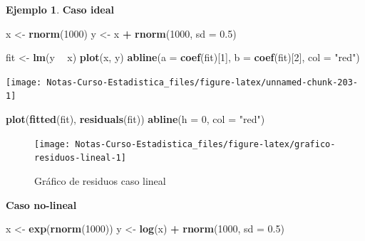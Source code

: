 \documentclass[
  12pt,
]{book}
\newenvironment{Shaded}{\begin{snugshade}}{\end{snugshade}}
\newcommand{\DataTypeTok}[1]{\textcolor[rgb]{0.13,0.29,0.53}{#1}}
\newcommand{\DecValTok}[1]{\textcolor[rgb]{0.00,0.00,0.81}{#1}}
\newcommand{\FloatTok}[1]{\textcolor[rgb]{0.00,0.00,0.81}{#1}}
\newcommand{\KeywordTok}[1]{\textcolor[rgb]{0.13,0.29,0.53}{\textbf{#1}}}
\newcommand{\NormalTok}[1]{#1}
\newcommand{\OperatorTok}[1]{\textcolor[rgb]{0.81,0.36,0.00}{\textbf{#1}}}
\newcommand{\StringTok}[1]{\textcolor[rgb]{0.31,0.60,0.02}{#1}}
\theoremstyle{definition}
\theoremstyle{definition}
\newtheorem{example}{Ejemplo}[chapter]
\theoremstyle{definition}
\theoremstyle{remark}
\begin{document}
\begin{example}

\textbf{Caso ideal}

\begin{Shaded}
\begin{Highlighting}[]
\NormalTok{x <-}\StringTok{ }\KeywordTok{rnorm}\NormalTok{(}\DecValTok{1000}\NormalTok{)}
\NormalTok{y <-}\StringTok{ }\NormalTok{x }\OperatorTok{+}\StringTok{ }\KeywordTok{rnorm}\NormalTok{(}\DecValTok{1000}\NormalTok{, }\DataTypeTok{sd =} \FloatTok{0.5}\NormalTok{)}

\NormalTok{fit <-}\StringTok{ }\KeywordTok{lm}\NormalTok{(y }\OperatorTok{~}\StringTok{ }\NormalTok{x)}
\KeywordTok{plot}\NormalTok{(x, y)}
\KeywordTok{abline}\NormalTok{(}\DataTypeTok{a =} \KeywordTok{coef}\NormalTok{(fit)[}\DecValTok{1}\NormalTok{], }\DataTypeTok{b =} \KeywordTok{coef}\NormalTok{(fit)[}\DecValTok{2}\NormalTok{], }\DataTypeTok{col =} \StringTok{"red"}\NormalTok{)}
\end{Highlighting}
\end{Shaded}

\begin{center}\texttt{[image: Notas-Curso-Estadistica\_files/figure-latex/unnamed-chunk-203-1]} \end{center}

\begin{Shaded}
\begin{Highlighting}[]
\KeywordTok{plot}\NormalTok{(}\KeywordTok{fitted}\NormalTok{(fit), }\KeywordTok{residuals}\NormalTok{(fit))}
\KeywordTok{abline}\NormalTok{(}\DataTypeTok{h =} \DecValTok{0}\NormalTok{, }\DataTypeTok{col =} \StringTok{"red"}\NormalTok{)}
\end{Highlighting}
\end{Shaded}

\begin{figure}

{\centering \texttt{[image: Notas-Curso-Estadistica\_files/figure-latex/grafico-residuos-lineal-1]} 

}

\caption{Gráfico de residuos caso lineal}\label{fig:grafico-residuos-lineal}
\end{figure}

\textbf{Caso no-lineal}

\begin{Shaded}
\begin{Highlighting}[]
\NormalTok{x <-}\StringTok{ }\KeywordTok{exp}\NormalTok{(}\KeywordTok{rnorm}\NormalTok{(}\DecValTok{1000}\NormalTok{))}
\NormalTok{y <-}\StringTok{ }\KeywordTok{log}\NormalTok{(x) }\OperatorTok{+}\StringTok{ }\KeywordTok{rnorm}\NormalTok{(}\DecValTok{1000}\NormalTok{, }\DataTypeTok{sd =} \FloatTok{0.5}\NormalTok{)}


\end{Highlighting}
\end{Shaded}
\end{example}
\end{document}
